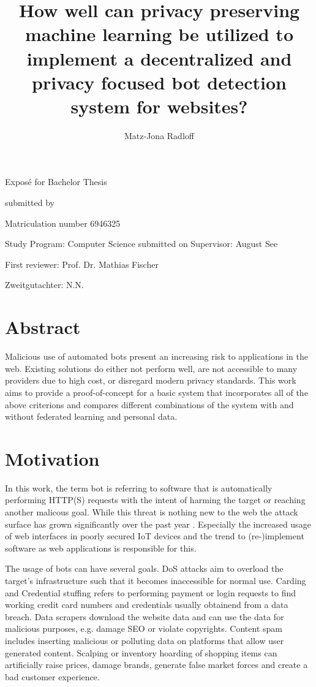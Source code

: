 \documentclass[
    fontsize=12pt,
    headings=small,
    parskip=half,           %
    bibliography=totoc,
    numbers=noenddot,       %
    open=any,               %
    final                   %
    ]{scrreprt}
\title{How well can privacy preserving machine learning be utilized to implement a decentralized and privacy focused bot detection system for websites?}
\author{Matz-Jona Radloff}
\begin{document}
\begin{titlepage}
\begin{center}\Large
	\vfill
    Exposé for Bachelor Thesis
	\vfill
	\makeatletter
	{\Large\textsf{\textbf{\@title}}\par}
	\makeatother
	\vfill
    submitted by
	\par\bigskip
	\makeatletter
	{\@author} \par
	\makeatother
	Matriculation number 6946325 \par
	Study Program: Computer Science
	\vfill
	\makeatletter
	submitted on {\@date}
	\makeatother
	\vfill
	Supervisor: August See\par
	First reviewer: Prof. Dr. Mathias Fischer \par
	Zweitgutachter: N.N.
\end{center}
\end{titlepage}


\chapter*{Abstract}

Malicious use of automated bots present an increasing risk to applications in the web. Existing solutions do either not perform well, are not accessible to many providers due to high cost, or disregard modern privacy standards. This work aims to provide a proof-of-concept for a basic system that incorporates all of the above criterions and compares different combinations of the system with and without federated learning and personal data.

\tableofcontents

\chapter{Motivation}

In this work, the term bot is referring to software that is automatically performing HTTP(S) requests with the intent of harming the target or reaching another malicous goal. While this threat is nothing new to the web the attack surface has grown significantly over the past year \cite{BAD_BOT_REPORT2020} \cite{BAD_BOT_REPORT2021}. Especially the increased usage of web interfaces in poorly secured IoT devices and the trend to (re-)implement software as web applications is responsible for this.

The usage of bots can have several goals. DoS attacks aim to overload the target's infrastructure such that it becomes inaccessible for normal use. Carding and Credential stuffing refers to performing payment or login requests to find working credit card numbers and credentials usually obtainend from a data breach. Data scrapers download the website data and can use the data for malicious purposes, e.g. damage SEO or violate copyrights. Content spam includes inserting malicious or polluting data on platforms that allow user generated content. Scalping or inventory hoarding of shopping items can artificially raise prices, damage brands, generate false market forces and create a bad customer experience.
\end{document}
